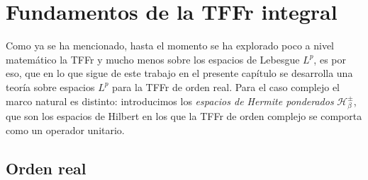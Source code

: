     \section{Fundamentos de la TFFr integral}
       
       Como ya se ha mencionado, hasta el momento se ha explorado poco a nivel matemático la TFFr y mucho menos sobre los espacios de Lebesgue $L^p$, es por eso, que en lo que sigue de este trabajo en el presente capítulo se desarrolla una teoría sobre espacios $L^p$ para la TFFr de orden real. Para el caso complejo el marco natural es distinto: introducimos los \textit{espacios de Hermite ponderados} $\mathcal{H}_\beta^\pm$, que son los espacios de Hilbert en los que la TFFr de orden complejo se comporta como un operador unitario.

       \subsection{Orden real}


